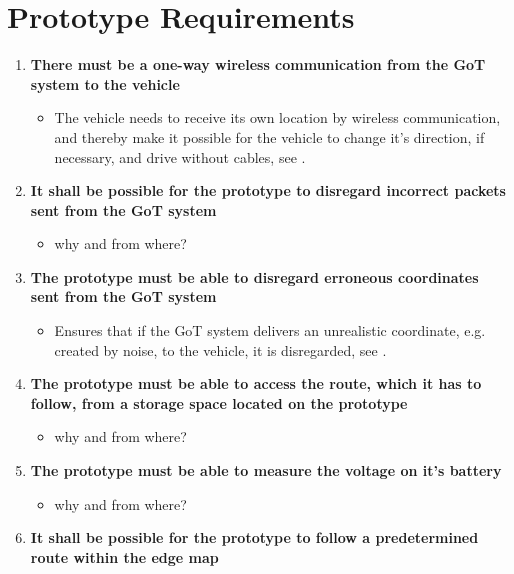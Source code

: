 \chapter{Prototype Requirements}

\begin{enumerate}
\item \textbf{There must be a one-way wireless communication from the GoT system to the vehicle}
	\begin{itemize}
	\item[] The vehicle needs to receive its own location by wireless communication, and thereby make it possible for the vehicle to change it's direction, if necessary, and drive without cables, see .
	\end{itemize}
\item \textbf{It shall be possible for the prototype to disregard incorrect packets sent from the GoT system}
	\begin{itemize}
	\item[] why and from where?
	\end{itemize}
	\item \textbf{The prototype must be able to disregard erroneous coordinates sent from the GoT system}
	\begin{itemize}
	\item[] Ensures that if the GoT system delivers an unrealistic coordinate, e.g. created by noise, to the vehicle, it is disregarded, see .
	\end{itemize}
\item \textbf{The prototype must be able to access the route, which it has to follow, from a storage space located on the prototype}
	\begin{itemize}
	\item[] why and from where?
	\end{itemize}
\item \textbf{The prototype must be able to measure the voltage on it's battery}
	\begin{itemize}
	\item[] why and from where?
	\end{itemize}
\item \textbf{It shall be possible for the prototype to follow a predetermined route within the edge map}

\end{enumerate}
